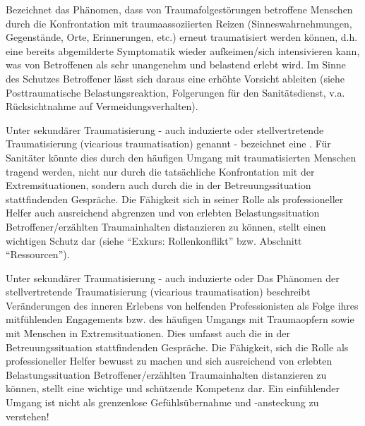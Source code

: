 Bezeichnet das Phänomen, dass von Traumafolgestörungen betroffene Menschen durch die Konfrontation mit traumaassoziierten Reizen (Sinneswahrnehmungen, Gegenstände, Orte, Erinnerungen, etc.) erneut traumatisiert werden können, d.h. eine bereits abgemilderte Symptomatik wieder aufkeimen/sich intensivieren kann, was von Betroffenen als sehr unangenehm und belastend erlebt wird. Im Sinne des Schutzes Betroffener lässt sich daraus eine erhöhte Vorsicht ableiten (siehe Posttraumatische Belastungsreaktion, Folgerungen für den Sanitätsdienst, v.a. Rücksichtnahme auf Vermeidungsverhalten).


{Unter sekundärer Traumatisierung - auch induzierte oder
stellvertretende Traumatisierung (vicarious traumatisation)
genannt -  bezeichnet eine . Für Sanitäter könnte dies
durch den häufigen Umgang mit traumatisierten Menschen
tragend werden, nicht nur durch die tatsächliche
Konfrontation mit der Extremsituationen, sondern auch durch
die in der Betreuungssituation stattfindenden Gespräche. Die
Fähigkeit sich in seiner Rolle als professioneller Helfer
auch ausreichend abgrenzen und von erlebten
Belastungssituation Betroffener/erzählten Traumainhalten
distanzieren zu können, stellt einen wichtigen Schutz dar
(siehe \enquote{Exkurs: Rollenkonflikt} bzw. Abschnitt
\enquote{Ressourcen}).

{Unter sekundärer Traumatisierung - auch induzierte oder
Das Phänomen der stellvertretende Traumatisierung (vicarious traumatisation) beschreibt Veränderungen des inneren
Erlebens von helfenden Professionisten als Folge ihres mitfühlenden Engagements bzw. des häufigen Umgangs mit Traumaopfern sowie 
mit Menschen in Extremsituationen. Dies umfasst auch die in der Betreuungssituation stattfindenden Gespräche. Die
Fähigkeit, sich die Rolle als professioneller Helfer bewusst zu machen und sich ausreichend von erlebten Belastungssituation Betroffener/erzählten Traumainhalten distanzieren zu können, stellt eine wichtige und schützende Kompetenz dar. Ein einfühlender Umgang ist nicht als grenzenlose Gefühlsübernahme und -ansteckung zu verstehen! 


}}
